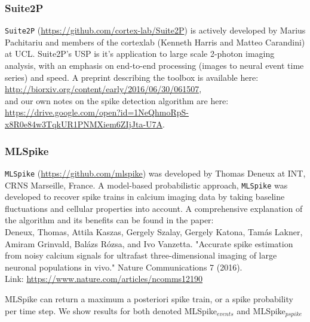 \documentclass[a4paper]{article}
\begin{document}
\subsubsection*{Suite2P}
\texttt{Suite2P} (\href{https://github.com/cortex-lab/Suite2P}{https://github.com/cortex-lab/Suite2P}) is actively developed by  Marius Pachitariu and members of the cortexlab (Kenneth Harris and Matteo Carandini) at UCL. Suite2P's USP is it's application to large scale 2-photon imaging analysis, with an emphasis on end-to-end processing (images to neural event time series) and speed. A preprint describing the toolbox is available here:\\

\noindent \href{http://biorxiv.org/content/early/2016/06/30/061507}{http://biorxiv.org/content/early/2016/06/30/061507}, \\

\noindent and our own notes on the spike detection algorithm are here:\\

\noindent \href{https://drive.google.com/open?id=1NeQhmoRpS-x8R0e84w3TqkUR1PNMXiem6ZIjJta-U7A}{https://drive.google.com/open?id=1NeQhmoRpS-x8R0e84w3TqkUR1PNMXiem6ZIjJta-U7A}.

\subsubsection*{MLSpike}
\texttt{MLSpike} (\href{https://github.com/mlspike}{https://github.com/mlspike}) was developed by Thomas Deneux at INT, CRNS Marseille, France. A model-based probabilistic approach, \texttt{MLSpike} was developed to recover spike trains in calcium imaging data by taking baseline fluctuations and cellular properties into account. A comprehensive explanation of the algorithm and its benefits can be found in the paper:\\

\noindent Deneux, Thomas, Attila Kaszas, Gergely Szalay, Gergely Katona, Tamás Lakner, Amiram Grinvald, Balázs Rózsa, and Ivo Vanzetta. "Accurate spike estimation from noisy calcium signals for ultrafast three-dimensional imaging of large neuronal populations in vivo." Nature Communications 7 (2016).\\

\noindent Link: \href{https://www.nature.com/articles/ncomms12190}{https://www.nature.com/articles/ncomms12190}

MLSpike can return a maximum a posteriori spike train, or a spike probability per time step. We show results for both denoted MLSpike$_{events}$ and MLSpike$_{pspike}$
\end{document}
